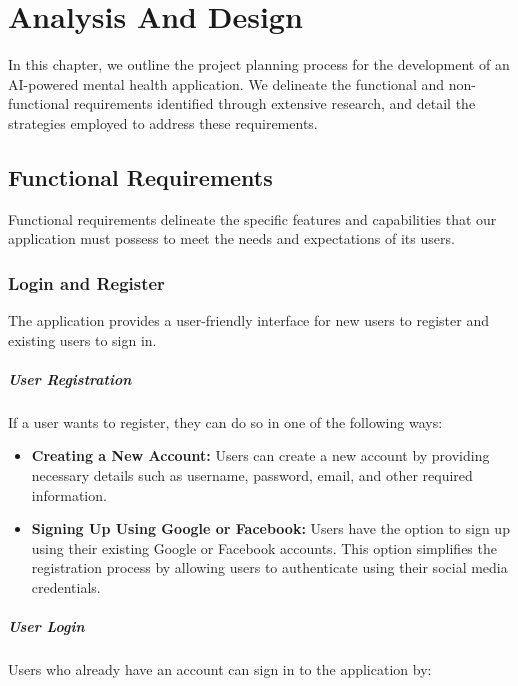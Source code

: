 \chapter{ Analysis And Design} 

In this chapter, we outline the project planning process for the development of an AI-powered mental health application. We delineate the functional and non-functional requirements identified through extensive research, and detail the strategies employed to address these requirements.

\section{Functional Requirements}
Functional requirements delineate the specific features and capabilities that our application must possess to meet the needs and expectations of its users.
\subsection{Login and Register}

The application provides a user-friendly interface for new users to register and existing users to sign in.

\paragraph{User Registration}

If a user wants to register, they can do so in one of the following ways:

\begin{itemize}
    \item \textbf{Creating a New Account:} Users can create a new account by providing necessary details such as username, password, email, and other required information. 
    \item \textbf{Signing Up Using Google or Facebook:} Users have the option to sign up using their existing Google or Facebook accounts. This option simplifies the registration process by allowing users to authenticate using their social media credentials.
\end{itemize}

\paragraph{User Login}

Users who already have an account can sign in to the application by:

